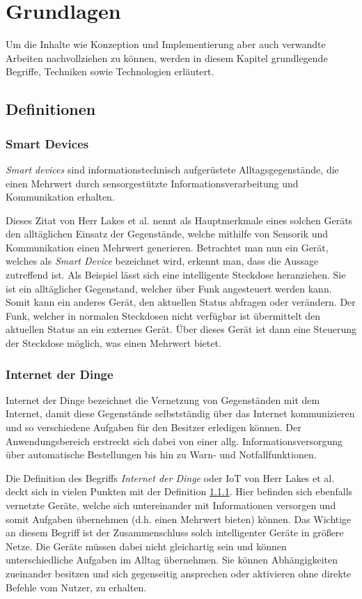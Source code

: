 \chapter{Grundlagen}
Um die Inhalte wie Konzeption und Implementierung aber auch verwandte Arbeiten nachvollziehen zu können, werden in diesem Kapitel grundlegende Begriffe, Techniken sowie Technologien erläutert.

\section{Definitionen} \label{Definitionen}
    \subsection{Smart Devices} \label{SmartDevices}
        \emph{Smart devices} sind \glqq informationstechnisch aufgerüstete Alltagsgegenstände, die einen Mehrwert durch sensorgestützte Informationsverarbeitung und Kommunikation erhalten.\grqq{} \cite{lackes_siepermann_2018}
        
        Dieses Zitat von Herr Lakes et al. nennt als Hauptmerkmale eines solchen Geräts den alltäglichen Einsatz der Gegenstände, welche mithilfe von Sensorik und Kommunikation einen Mehrwert generieren.
        Betrachtet man nun ein Gerät, welches als \emph{Smart Device} bezeichnet wird, erkennt man, dass die Aussage zutreffend ist. Als Beispiel lässt sich eine intelligente Steckdose heranziehen. Sie ist ein alltäglicher Gegenstand, welcher über Funk angesteuert werden kann. Somit kann ein anderes Gerät, den aktuellen Status abfragen oder verändern.
        Der Funk, welcher in normalen Steckdosen nicht verfügbar ist übermittelt den aktuellen Status an ein externes Gerät. Über dieses Gerät ist dann eine Steuerung der Steckdose möglich, was einen Mehrwert bietet.
    
    \subsection{Internet der Dinge}
        Internet der Dinge \glqq bezeichnet die Vernetzung von Gegenständen mit dem Internet, damit diese Gegenstände selbstständig über das Internet kommunizieren und so verschiedene Aufgaben für den Besitzer erledigen können. Der Anwendungsbereich erstreckt sich dabei von einer allg. Informationsversorgung über automatische Bestellungen bis hin zu Warn- und Notfallfunktionen.\grqq{}
        \cite{lackes_siepermann_2018_iot}
    
        Die Definition des Begriffs \emph{Internet der Dinge} oder \ac{IoT} von Herr Lakes et al. deckt sich in vielen Punkten mit der Definition \ref{SmartDevices}. Hier befinden sich ebenfalls vernetzte Geräte, welche sich untereinander mit Informationen versorgen und somit Aufgaben übernehmen (d.h. einen Mehrwert bieten) können. Das Wichtige an diesem Begriff ist der Zusammenschluss solch intelligenter Geräte in größere Netze. Die Geräte müssen dabei nicht gleichartig sein und können unterschiedliche Aufgaben im Alltag übernehmen. Sie können Abhängigkeiten zueinander besitzen und sich gegenseitig ansprechen oder aktivieren ohne direkte Befehle vom Nutzer, zu erhalten.
        
